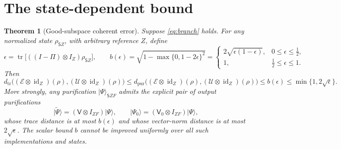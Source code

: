 \documentclass[11pt]{article}
\newtheorem{theorem}{Theorem}
\newcommand{\ket}[1]{\lvert #1\rangle}
\newcommand{\tr}{\operatorname{tr}}
\newcommand{\id}{\operatorname{id}}
\newcommand{\Dtr}{d_{\mathrm{tr}}}
\newcommand{\Dpur}{d_{\mathrm{pur}}}
\newcommand{\EE}{\mathcal E}
\newcommand{\UU}{\mathcal U}
\newcommand{\VV}{\mathsf V}
\begin{document}
\section{The state-dependent bound}

\begin{theorem}[Good-subspace coherent error]\label{thm:one}
Suppose \eqref{eq:branch} holds. For any normalized state $\rho_{\mathsf S Z}$, with arbitrary reference $Z$, define
\begin{equation}
 \epsilon=\tr\bigl[((I-\Pi)\otimes I_Z)\rho_{\mathsf S Z}\bigr],
 \qquad
 b(\epsilon)=\sqrt{1-\max\{0,1-2\epsilon\}^2}
 =\begin{cases}
 2\sqrt{\epsilon(1-\epsilon)},&0\leq\epsilon\leq\tfrac12,\\
 1,&\tfrac12\leq\epsilon\leq1.
 \end{cases}
 \label{eq:b}
\end{equation}
Then
\begin{equation}
 \Dtr\bigl((\EE\otimes\id_Z)(\rho),(\UU\otimes\id_Z)(\rho)\bigr)
 \leq
 \Dpur\bigl((\EE\otimes\id_Z)(\rho),(\UU\otimes\id_Z)(\rho)\bigr)
 \leq b(\epsilon)\leq \min\{1,2\sqrt\epsilon\}.
 \label{eq:bound}
\end{equation}
More strongly, any purification $\ket\Psi_{\mathsf S Z F}$ admits the explicit pair of output purifications
\begin{equation}
 \ket{\widetilde\Psi}=(\VV\otimes I_{ZF})\ket\Psi,
 \qquad \ket{\Psi_0}=(\VV_0\otimes I_{ZF})\ket\Psi,
\end{equation}
whose trace distance is at most $b(\epsilon)$ and whose vector-norm distance is at most $2\sqrt\epsilon$. The scalar bound $b$ cannot be improved uniformly over all such implementations and states.
\end{theorem}
\end{document}
